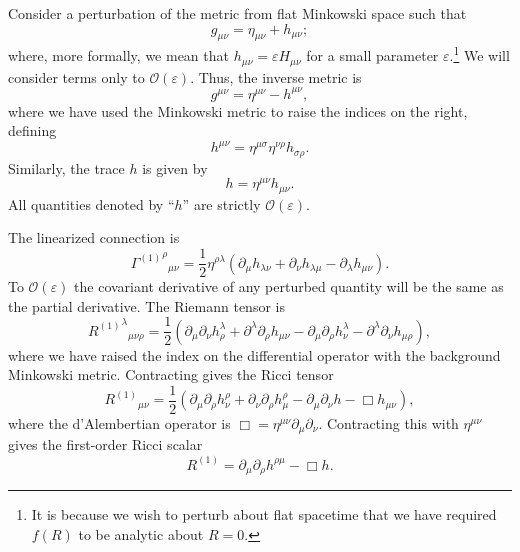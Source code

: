 \documentclass[aps,prd,amsfonts,amssymb,amsmath,nofootinbib,reprint,showpacs]{revtex4-1}
\newcommand{\order}[1]{\ensuremath{\mathcal{O}({#1})}}
\begin{document}
Consider a perturbation of the metric from flat Minkowski space such that
\begin{equation}
g_{\mu\nu} = \eta_{\mu\nu} + h_{\mu\nu};
\end{equation}
where, more formally, we mean that $h_{\mu\nu} = \varepsilon H_{\mu\nu}$ for a small parameter $\varepsilon$.\footnote{It is because we wish to perturb about flat spacetime that we have required $f(R)$ to be analytic about $R = 0$.} We will consider terms only to $\order{\varepsilon}$. Thus, the inverse metric is
\begin{equation}
g^{\mu\nu} = \eta^{\mu\nu} - h^{\mu\nu},
\end{equation}
where we have used the Minkowski metric to raise the indices on the right, defining
\begin{equation}
h^{\mu\nu} = \eta^{\mu\sigma}\eta^{\nu\rho}h_{\sigma\rho}.
\end{equation}
Similarly, the trace $h$ is given by
\begin{equation}
h = \eta^{\mu\nu}h_{\mu\nu}.
\end{equation}
All quantities denoted by ``$h$'' are strictly $\order{\varepsilon}$.

The linearized connection is
\begin{equation}
{{\Gamma^{(1)}}^\rho}_{\mu\nu} = \frac{1}{2}\eta^{\rho\lambda}(\partial_\mu h_{\lambda\nu} + \partial_\nu h_{\lambda\mu} - \partial_\lambda h_{\mu\nu}).
\label{eq:Lin_Gamma}
\end{equation}
To $\order{\varepsilon}$ the covariant derivative of any perturbed quantity will be the same as the partial derivative. The Riemann tensor is
\begin{equation}
{{R^{(1)}}^\lambda}_{\mu\nu\rho} = \frac{1}{2}(\partial_\mu\partial_\nu h^\lambda_\rho + \partial^\lambda\partial_\rho h_{\mu\nu} - \partial_\mu\partial_\rho h^\lambda_\nu - \partial^\lambda\partial_\nu h_{\mu\rho}),
\label{eq:Lin_Riemann}
\end{equation}
where we have raised the index on the differential operator with the background Minkowski metric. Contracting gives the Ricci tensor
\begin{equation}
{R^{(1)}}_{\mu\nu} = \frac{1}{2}(\partial_\mu\partial_\rho h^\rho_\nu + \partial_\nu\partial_\rho h^\rho_\mu - \partial_\mu\partial_\nu h - \Box h_{\mu\nu}),
\label{eq:Ricci}
\end{equation}
where the d'Alembertian operator is $\Box = \eta^{\mu\nu}\partial_\mu\partial_\nu$. Contracting this with $\eta^{\mu\nu}$ gives the first-order Ricci scalar
\begin{equation}
R^{(1)} = \partial_\mu\partial_\rho h^{\rho\mu} - \Box h.
\label{eq:Scalar}
\end{equation}
\end{document}
